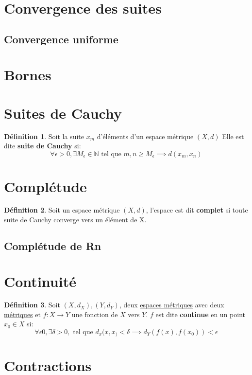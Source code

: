 \documentclass[12pt]{book}
\let\Bbb\mathbb
\newcommand\todo[1]{\phantom{#1}}
\theoremstyle{definition}
\newtheorem{definition}{Définition}[section]
\begin{document}
\section{Convergence des suites}
\subsection{Convergence uniforme}
\section{Bornes}
\section{Suites de Cauchy}
\begin{definition}
    \label{def:suite_cauchy} Soit la suite \todo{Add link} ${x_m}$ d'éléments d'un espace métrique $(X, d)$
    Elle est dite \textbf{suite de Cauchy} si:
    $$ \forall \epsilon > 0, \exists M_\epsilon \in \Bbb N \text{ tel que } m, n \geq M_\epsilon \implies d(x_m, x_n) $$
\end{definition}
\section{Complétude}
\begin{definition}
    \label{def:completude}
    Soit un espace métrique $(X, d)$, l'espace est dit \textbf{complet} si toute \hyperref[def:suite_cauchy]{suite de Cauchy} converge vers un élément de X.
\end{definition}
\subsection{Complétude de Rn}

\section{Continuité}
\begin{definition}
    \label{def:continuite}
    Soit $(X, d_X), (Y, d_Y)$, deux \hyperref[def:metrique]{espaces métriques} avec deux \hyperref[def:metrique]{métriques} et $f: X \to Y$ une fonction de $X$ vers $Y$.
    $f$ est dite \textbf{continue} en un point $x_0 \in X$ si:
    $$ \forall \epsilon 0, \exists \delta > 0,\text{ tel que }d_x(x, x_) < \delta \implies d_Y(f(x), f(x_0)) < \epsilon $$
\end{definition}
\section{Contractions}
\end{document}
